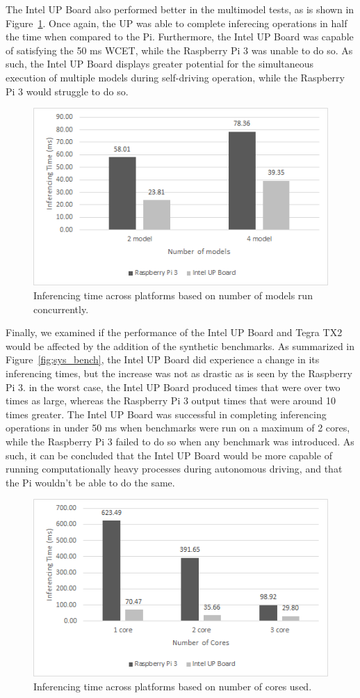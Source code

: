 The Intel UP Board also performed better in the multimodel tests, as is shown in 
Figure~\ref{fig:sys_model}. Once again, the UP was able to complete inferecing operations in half the 
time when compared to the Pi. Furthermore, the Intel UP Board was capable of satisfying the 50 ms 
WCET, while the Raspberry Pi 3 was unable to do so. As such, the Intel UP Board displays greater 
potential for the simultaneous execution of multiple models during self-driving operation, while the 
Raspberry Pi 3 would struggle to do so.

\begin{figure}[h]
  \centering
  \includegraphics[width=.5\textwidth]{figs/system_multimodel}
  \caption{Inferencing time across platforms based on number of models run concurrently.}
  \label{fig:sys_model}
\end{figure}

Finally, we examined if the performance of the Intel UP Board and Tegra TX2 would be affected by the 
addition of the synthetic benchmarks. As summarized in Figure~\ref{fig;sys_bench}, the Intel UP Board 
did experience a change in its inferencing times, but the increase was not as drastic as is seen by 
the Raspberry Pi 3. in the worst case, the Intel UP Board produced times that were over two times as 
large, whereas the Raspberry Pi 3 output times that were around 10 times greater. The Intel UP Board 
was successful in completing inferencing operations in under 50 ms when benchmarks were run on a 
maximum of 2 cores, while the Raspberry Pi 3 failed to do so when any benchmark was introduced. As 
such, it can be concluded that the Intel UP Board would be more capable of running computationally 
heavy processes during autonomous driving, and that the Pi wouldn't be able to do the same.

\begin{figure}[h]
  \centering
  \includegraphics[width=.5\textwidth]{figs/system_benchmark}
  \caption{Inferencing time across platforms based on number of cores used.}
  \label{fig:sys_bench}
\end{figure} 

